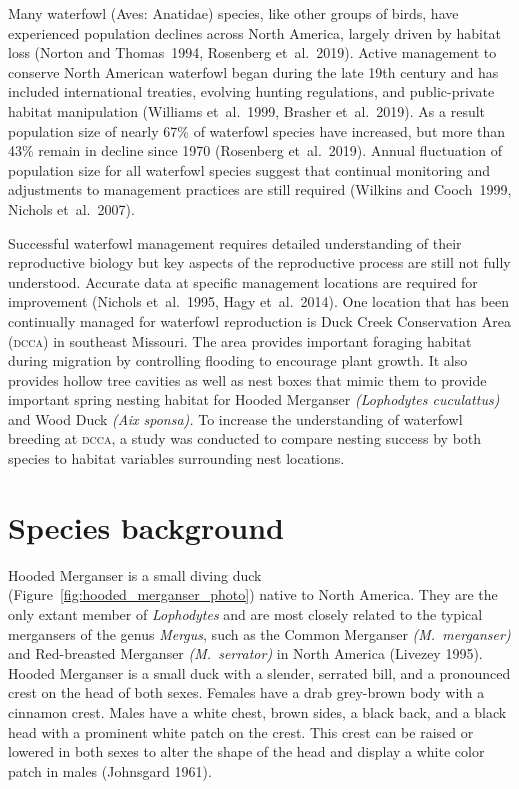 
Many waterfowl (Aves: Anatidae) species, like other groups of birds, have experienced population declines across North America, largely driven by habitat loss (Norton and Thomas~1994, Rosenberg et~al.~2019).  Active management to conserve North American waterfowl began during the late 19th century and has included international treaties, evolving hunting regulations, and public-private habitat manipulation (Williams et~al.~1999, Brasher et~al.~2019). As a result population size of nearly 67\% of waterfowl species have increased, but more than 43\% remain in decline since 1970 (Rosenberg et~al.~2019). Annual fluctuation of population size for all waterfowl species suggest that continual monitoring and adjustments to management practices are still required  (Wilkins and Cooch~1999, Nichols et~al.~2007). 

Successful waterfowl management requires detailed understanding of their reproductive biology but key aspects of the reproductive process are still not fully understood. Accurate data at specific management locations are required for improvement (Nichols et~al.~1995, Hagy et~al.~2014). One location that has been continually managed for waterfowl reproduction is Duck Creek Conservation Area \textsc{(dcca)} in southeast Missouri. The area provides important foraging habitat during migration by controlling flooding to encourage plant growth. It also provides hollow tree cavities as well as nest boxes that mimic them to provide important spring nesting habitat for Hooded Merganser \textit{(Lophodytes cuculattus)} and Wood Duck \textit{(Aix sponsa).} To increase the understanding of waterfowl breeding at \textsc{dcca}, a study was conducted to compare nesting success by both species to habitat variables surrounding nest locations.  



\section*{Species background}

Hooded Merganser is a small diving duck (Figure~\ref{fig:hooded_merganser_photo}) native to North America. They are the only extant member of \textit{Lophodytes} and are most closely related to the typical mergansers of the genus \textit{Mergus}, such as the Common Merganser \textit{(M.~merganser)} and Red-breasted Merganser \textit{(M.~serrator)} in North America (Livezey 1995). Hooded Merganser is a small duck with a slender, serrated bill, and a pronounced crest on the head of both sexes. Females have a drab grey-brown body with a cinnamon crest. Males have a white chest, brown sides, a black back, and a black head with a prominent white patch on the crest. This crest can be raised or lowered in both sexes to alter the shape of the head and display a white color patch in males (Johnsgard 1961). 

